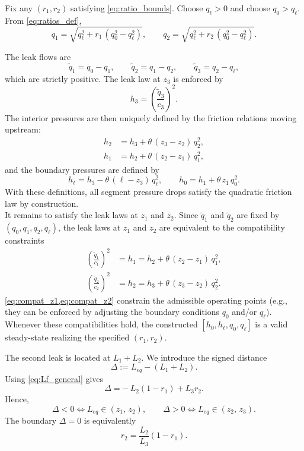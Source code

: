 Fix any $(r_1,r_2)$ satisfying \cref{eq:ratio_bounds}. Choose $q_{\ell}>0$ and choose $q_0>q_{\ell}$.
From \cref{eq:ratios_def},
\begin{equation*}
q_1 = \sqrt{q_{\ell}^2 + r_1\,(q_0^2-q_{\ell}^2)}, 
\qquad
q_2 = \sqrt{q_{\ell}^2 + r_2\,(q_0^2-q_{\ell}^2)}.
\end{equation*}

The leak flows are
\begin{equation*}
\tilde{q}_{1}=q_0-q_1,\qquad
\tilde{q}_{2}=q_1-q_2,\qquad
\tilde{q}_{3}=q_2-q_{\ell},
\end{equation*}
which are strictly positive. The leak law at $z_3$ is enforced by
\begin{equation*}
h_3=\left(\frac{\tilde{q}_{3}}{c_3}\right)^2.
\end{equation*}
The interior pressures are then uniquely defined by the friction relations moving upstream:
\begin{align*}
h_2 &= h_3+\theta\,(z_3-z_2)\,q_2^2,\\
h_1 &= h_2+\theta\,(z_2-z_1)\,q_1^2,
\end{align*}
and the boundary pressures are defined by
\begin{equation*}
h_{\ell} = h_3-\theta\,(\ell-z_3)\,q_{\ell}^2,
\qquad
h_0 = h_1+\theta\,z_1\,q_0^2.
\end{equation*}
With these definitions, all segment pressure drops satisfy the quadratic friction law by construction.\\

It remains to satisfy the leak laws at $ z_1$ and $ z_2$. Since $\tilde{q}_{1}$ and $\tilde{q}_{2}$ are fixed by
$(q_0,q_1,q_2,q_{\ell})$, the leak laws at $z_1$ and $z_2$ are equivalent to the compatibility constraints
\begin{align}
\left(\frac{\tilde{q}_{1}}{c_1}\right)^2 &= h_1=h_2+\theta\,(z_2-z_1)\,q_1^2,
\label{eq:compat_z1}\\
\left(\frac{\tilde{q}_{2}}{c_2}\right)^2 &= h_2=h_3+\theta\,(z_3-z_2)\,q_2^2.
\label{eq:compat_z2}
\end{align}
\cref{eq:compat_z1,eq:compat_z2} constrain the admissible operating points (e.g., they can be enforced by adjusting the boundary conditions $q_0$ and/or $q_{\ell}$). Whenever these compatibilities hold, the constructed $[h_0,h_{\ell},q_0,q_{\ell}]$ is a valid steady-state realizing the specified $(r_1,r_2)$.

The second leak is located at $L_1+L_2$. We introduce the signed distance
\begin{equation*}
\Delta := L_{eq} - (L_1+L_2).
\end{equation*}
Using \cref{eq:Lf_general} gives
\begin{equation}\label{eq:Delta_r}
\Delta
=
-\,L_2(1-r_1)+L_3 r_2.
\end{equation}
Hence,
\begin{equation}\label{eq:intervals}
\Delta < 0 \iff L_{eq} \in (z_1,\,z_2),
\qquad
\Delta > 0 \iff L_{eq} \in (z_2,\,z_3).
\end{equation}
The boundary $\Delta=0$ is equivalently
\begin{equation*}
r_2 = \frac{L_2}{L_3}(1-r_1).
\end{equation*}


